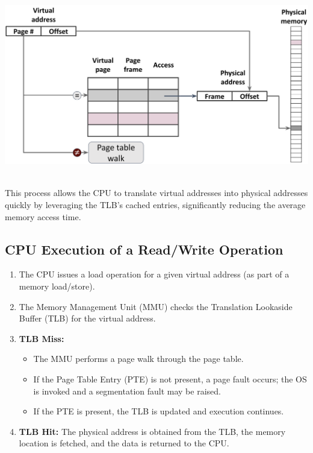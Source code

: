 \documentclass[../../compsys.tex]{subfiles}
\begin{document}
\hfill
\vline
\hfill
\begin{minipage}{0.45\textwidth}
  \begin{center}
    \includegraphics[width=1.25\textwidth]{chapters/L5/images/tlb.png}
  \end{center}
\end{minipage}\\[9px]

This process allows the CPU to translate virtual addresses into physical addresses quickly by leveraging the TLB's cached entries, significantly reducing the average memory access time.
\newpage
\subsection{CPU Execution of a Read/Write Operation}
\begin{enumerate}
    \item The CPU issues a load operation for a given virtual address (as part of a memory load/store).
    \item The Memory Management Unit (MMU) checks the Translation Lookaside Buffer (TLB) for the virtual address.
    \item \textbf{TLB Miss:}
    \begin{itemize}
        \item The MMU performs a page walk through the page table.
        \item If the Page Table Entry (PTE) is not present, a page fault occurs; the OS is invoked and a segmentation fault may be raised.
        \item If the PTE is present, the TLB is updated and execution continues.
    \end{itemize}
    \item \textbf{TLB Hit:} The physical address is obtained from the TLB, the memory location is fetched, and the data is returned to the CPU.
\end{enumerate}
\end{document}

